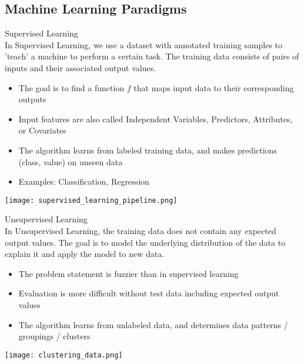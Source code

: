 \columnbreak

\subsection{Machine Learning Paradigms}

\begin{concept}{Supervised Learning}\\
    In Supervised Learning, we use a dataset with annotated training samples to 'teach' a machine to perform a certain task. The training data consists of pairs of inputs and their associated output values.
    \begin{itemize}
        \item The goal is to find a function $f$ that maps input data to their corresponding outputs
        \item Input features are also called Independent Variables, Predictors, Attributes, or Covariates
        \item The algorithm learns from labeled training data, and makes predictions (class, value) on unseen data
        \item Examples: Classification, Regression
    \end{itemize}

    \texttt{[image: supervised\_learning\_pipeline.png]}
\end{concept}

\begin{concept}{Unsupervised Learning}\\
    In Unsupervised Learning, the training data does not contain any expected output values. The goal is to model the underlying distribution of the data to explain it and apply the model to new data.
    \begin{itemize}
        \item The problem statement is fuzzier than in supervised learning
        \item Evaluation is more difficult without test data including expected output values
        \item The algorithm learns from unlabeled data, and determines data patterns / groupings / clusters
    \end{itemize}

    \texttt{[image: clustering\_data.png]}
\end{concept}

